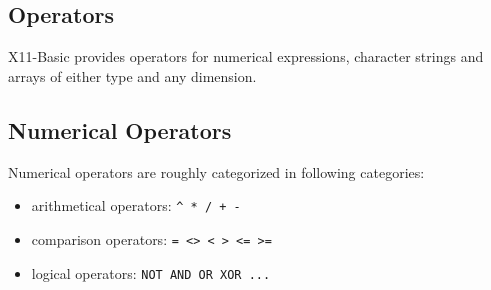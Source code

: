 \subsection{Operators}

X11-Basic provides operators for numerical expressions, character strings and
arrays of either type and any dimension.

\subsection*{Numerical Operators}

Numerical operators are roughly categorized in following categories:
\begin{itemize}
\item arithmetical operators:  \verb|^ * / + -| 
\item comparison operators:  \verb|= <> < > <= >=| 
\item logical operators:     \verb|NOT AND OR XOR ...|
\end{itemize}

